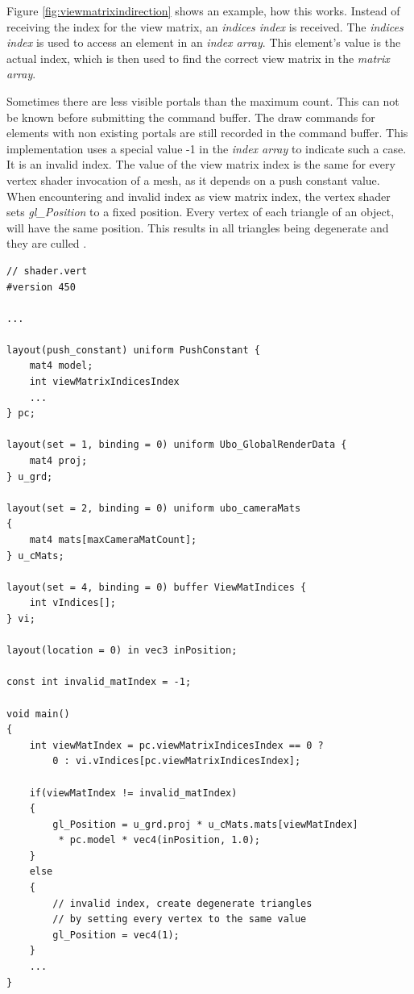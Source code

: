 Figure \ref{fig:viewmatrixindirection} shows an example, how this works. Instead of receiving the index for the view matrix, an \textit{indices index} is received. The \textit{indices index} is used to access an element in an \textit{index array}. This element's value is the actual index, which is then used to find the correct view matrix in the \textit{matrix array}.

Sometimes there are less visible portals than the maximum count. This can not be known before submitting the command buffer. The draw commands for elements with non existing portals are still recorded in the command buffer. This implementation uses a special value -1 in the \textit{index array} to indicate such a case. It is an invalid index. The value of the view matrix index is the same for every vertex shader invocation of a mesh, as it depends on a push constant value. When encountering and invalid index as view matrix index, the vertex shader sets \textit{gl\_Position} to a fixed position. Every vertex of each triangle of an object, will have the same position. This results in all triangles being degenerate and they are culled \cite{khronos:vulkan:spec1.1}.

\begin{lstlisting}[caption={View Matrix Selection}, label=listing:viewmatrixselection]
// shader.vert
#version 450

...

layout(push_constant) uniform PushConstant {	
	mat4 model;
	int viewMatrixIndicesIndex
	...
} pc;

layout(set = 1, binding = 0) uniform Ubo_GlobalRenderData {
	mat4 proj;
} u_grd;

layout(set = 2, binding = 0) uniform ubo_cameraMats
{
	mat4 mats[maxCameraMatCount];
} u_cMats;

layout(set = 4, binding = 0) buffer ViewMatIndices {
	int vIndices[];
} vi;

layout(location = 0) in vec3 inPosition;

const int invalid_matIndex = -1;

void main()
{
	int viewMatIndex = pc.viewMatrixIndicesIndex == 0 ? 
		0 : vi.vIndices[pc.viewMatrixIndicesIndex];
	
	if(viewMatIndex != invalid_matIndex)
	{
		gl_Position = u_grd.proj * u_cMats.mats[viewMatIndex]
		 * pc.model * vec4(inPosition, 1.0);
	}
	else
	{
		// invalid index, create degenerate triangles
		// by setting every vertex to the same value
		gl_Position = vec4(1);
	}
	...
}

\end{lstlisting}

